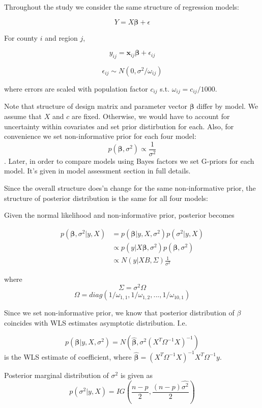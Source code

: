\documentclass[11pt,twocolumn]{asaproc}
\begin{document}
Throughout the study we consider the same structure of regression models:

$$Y = X \pmb{\beta}  + \epsilon$$ 

For county $i$ and region $j$, 

$$y_{ij} = \mathbf{x}_{ij}\pmb{\beta}  + \epsilon_{ij}$$

$$\epsilon_{ij} \sim N(0, \sigma^2  / \omega_{ij})$$

where errors are scaled with population factor $c_{ij}$ s.t. $\omega_{ij} = c_{ij} / 1000$. 

Note that structure of design matrix and parameter vector $\pmb{\beta} $ differ by model. We assume that $X$ and $c$ are fixed. Otherwise, we would have to account for uncertainty within covariates and set prior distirbution for each. Also, for convenience we set non-informative prior for each four model: $$ p(\pmb{\beta} , \sigma^2) \propto \frac{1}{\sigma^2}$$. Later, in order to compare models using Bayes factors we set G-priors for each model. It's given in model assessment section in full details. 

Since the overall structure does'n change for the same non-informative prior, the structure of posterior distribution is the same for all four models:

Given the normal likelihood and non-informative prior, posterior becomes 

\begin{align*}
p(\pmb{\beta}, \sigma^2 | y, X) & = p(\pmb{\beta} | y, X, \sigma^2) p(\sigma^2 | y, X) \\
& \propto p(y | X\pmb{\beta}, \sigma^2) p(\pmb{\beta}, \sigma^2) \\
&\propto N(y | XB, \Sigma) \frac{1}{\sigma^2}
\end{align*}
 
 where $$\Sigma = \sigma^2 \Omega$$ $$\Omega = diag(1/\omega_{1,1}, 1/\omega_{1,2}, ..., 1/\omega_{10,1})$$
 
 Since we set non-informative prior, we know that posterior distribution of $\beta$ coincides with WLS estimates asymptotic distribution. I.e. 
 
 $$p(\pmb{\beta}| y, X, \sigma^2)  = N(\hat{\pmb{\beta}}, \sigma^2(X^{T}\Omega^{-1}X)^{-1})$$ is the WLS estimate of coefficient, where $\hat{\pmb{\beta}} = (X^T \Omega^{-1}X)^{-1} X^T  \Omega^{-1} y$. 
 
 Posterior marginal distribution of $\sigma^2$ is given as 
  $$p(\sigma^2 | y, X)  = IG (\frac{n-p}{2}, \frac{(n-p)\hat{\sigma^2}}{2})$$
\end{document}
